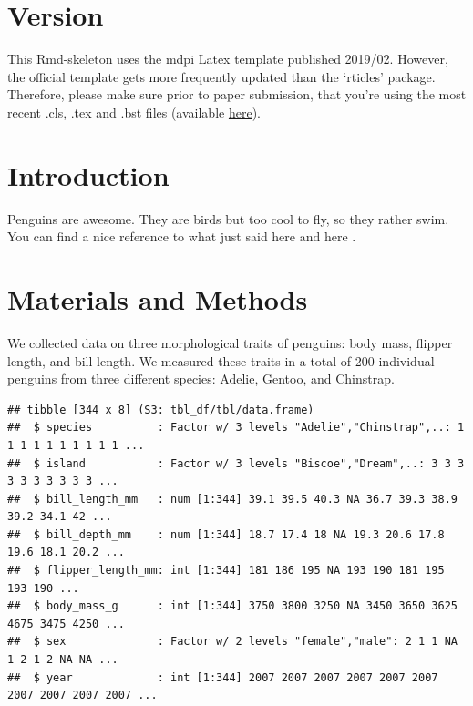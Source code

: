 \documentclass[water,article,submit,moreauthors,pdftex]{mdpi}
\begin{document}

\hypertarget{version}{%
\section{Version}\label{version}}

This Rmd-skeleton uses the mdpi Latex template published 2019/02.
However, the official template gets more frequently updated than the
`rticles' package. Therefore, please make sure prior to paper
submission, that you're using the most recent .cls, .tex and .bst files
(available \href{http://www.mdpi.com/authors/latex}{here}).

\hypertarget{introduction}{%
\section{Introduction}\label{introduction}}

Penguins are awesome. They are birds but too cool to fly, so they rather
swim. You can find a nice reference to what just said here
\citep{https://doi.org/10.1002/ecs2.4417} and here
\citep{leutnant_stormwater_2016}.

\hypertarget{materials-and-methods}{%
\section{Materials and Methods}\label{materials-and-methods}}

We collected data on three morphological traits of penguins: body mass,
flipper length, and bill length. We measured these traits in a total of
200 individual penguins from three different species: Adelie, Gentoo,
and Chinstrap.

\begin{verbatim}
## tibble [344 x 8] (S3: tbl_df/tbl/data.frame)
##  $ species          : Factor w/ 3 levels "Adelie","Chinstrap",..: 1 1 1 1 1 1 1 1 1 1 ...
##  $ island           : Factor w/ 3 levels "Biscoe","Dream",..: 3 3 3 3 3 3 3 3 3 3 ...
##  $ bill_length_mm   : num [1:344] 39.1 39.5 40.3 NA 36.7 39.3 38.9 39.2 34.1 42 ...
##  $ bill_depth_mm    : num [1:344] 18.7 17.4 18 NA 19.3 20.6 17.8 19.6 18.1 20.2 ...
##  $ flipper_length_mm: int [1:344] 181 186 195 NA 193 190 181 195 193 190 ...
##  $ body_mass_g      : int [1:344] 3750 3800 3250 NA 3450 3650 3625 4675 3475 4250 ...
##  $ sex              : Factor w/ 2 levels "female","male": 2 1 1 NA 1 2 1 2 NA NA ...
##  $ year             : int [1:344] 2007 2007 2007 2007 2007 2007 2007 2007 2007 2007 ...
\end{verbatim}
\end{document}
